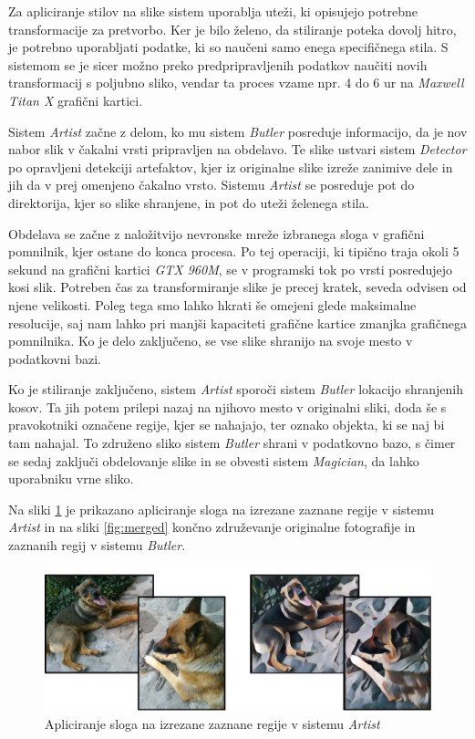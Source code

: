 \documentclass[runningheads,a4paper]{llncs}
\begin{document}
Za apliciranje stilov na slike sistem uporablja uteži, ki opisujejo potrebne transformacije za pretvorbo. Ker je bilo želeno, da stiliranje poteka dovolj hitro, je potrebno uporabljati podatke, ki so naučeni samo enega specifičnega stila. S sistemom se je sicer možno preko predpripravljenih podatkov \cite{vgg-19} naučiti novih transformacij s poljubno sliko, vendar ta proces vzame npr. 4 do 6 ur na \textit{ Maxwell Titan X} grafični kartici.

Sistem \textit{Artist} začne z delom, ko mu sistem \textit{Butler} posreduje informacijo, da je nov nabor slik v čakalni vrsti pripravljen na obdelavo. Te slike ustvari sistem \textit{Detector} po opravljeni detekciji artefaktov, kjer iz originalne slike izreže zanimive dele in jih da v prej omenjeno čakalno vrsto. Sistemu \textit{Artist} se posreduje pot do direktorija, kjer so slike shranjene, in pot do uteži želenega stila.

Obdelava se začne z naložitvijo nevronske mreže izbranega sloga v grafični pomnilnik, kjer ostane do konca procesa. Po tej operaciji, ki tipično traja okoli 5 sekund na grafični kartici \textit{GTX 960M}, se v programski tok po vrsti posredujejo kosi slik. Potreben čas za transformiranje slike je precej kratek, seveda odvisen od njene velikosti. Poleg tega smo lahko hkrati še omejeni glede maksimalne resolucije, saj nam lahko pri manjši kapaciteti grafične kartice zmanjka grafičnega pomnilnika. Ko je delo zaključeno, se vse slike shranijo na svoje mesto v podatkovni bazi.

Ko je stiliranje zaključeno, sistem \textit{Artist} sporoči sistem \textit{Butler} lokacijo shranjenih kosov. Ta jih potem prilepi nazaj na njihovo mesto v originalni sliki, doda še s pravokotniki označene regije, kjer se nahajajo, ter oznako objekta, ki se naj bi tam nahajal. To združeno sliko sistem \textit{Butler} shrani v podatkovno bazo, s čimer se sedaj zaključi obdelovanje slike in se obvesti sistem \textit{Magician}, da lahko uporabniku vrne sliko.

Na sliki \ref{fig:detector_artist} je prikazano apliciranje sloga na izrezane zaznane regije v sistemu \textit{Artist} in na sliki \ref{fig:merged} končno združevanje originalne fotografije in zaznanih regij v sistemu \textit{Butler}.

\begin{figure}[H]
\centering
\includegraphics[width=\textwidth, center]{figures/neural_example/detector_artist.png}
\caption{Apliciranje sloga na izrezane zaznane regije v sistemu \textit{Artist}}
\label{fig:detector_artist}
\end{figure}
\end{document}
